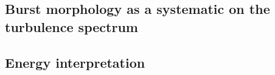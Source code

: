 




\subsection{Burst morphology as a systematic on the turbulence spectrum}
\label{sec:disc-alpha}

%

\subsection{Energy interpretation}
\label{sec:disc-energies}

